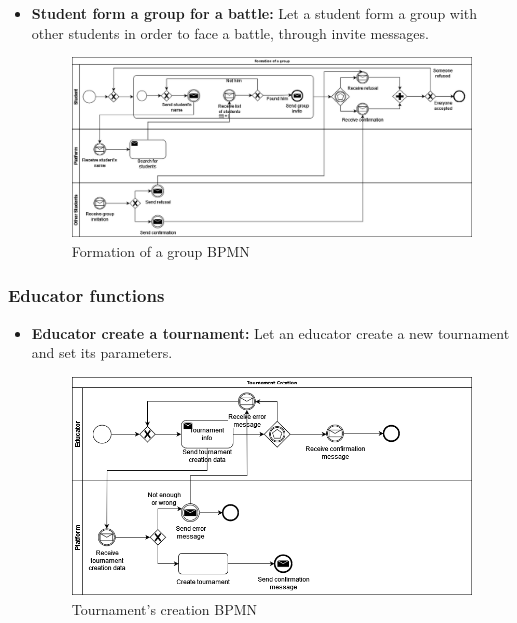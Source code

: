 \documentclass{article}
\begin{document}
{\begin{itemize}
            \item \textbf{Student form a group for a battle:} Let a student form a group with other students in order to face a battle, through invite messages.
            \begin{figure}[H]
                \centering
                \hspace*{-1.85cm}\includegraphics[scale=0.4]{images/BPMN/GroupFormation.png}
                \caption{Formation of a group BPMN}
                \label{fig:groupFormationBPMN}
            \end{figure}
        \end{itemize}

    \subsubsection{Educator functions}
        \begin{itemize}
            \item \textbf{Educator create a tournament:} Let an educator create a new tournament and set its parameters.
            \begin{figure}[H]
                \centering
                \includegraphics[scale=0.4]{images/BPMN/TournamentCreation.png}
                \caption{Tournament's creation BPMN}
                \label{fig:TournamentCreationBPMN}
            \end{figure}


\end{itemize}}
\end{document}
